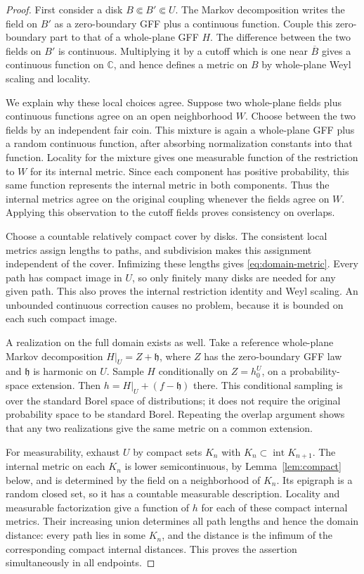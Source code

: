 \documentclass[11pt]{article}
\theoremstyle{definition}
\theoremstyle{remark}
\newcommand{\C}{\mathbb C}
\begin{document}
\begin{proof}
First consider a disk $B\Subset B'\Subset U$. The Markov
decomposition writes the field on $B'$ as a zero-boundary GFF plus
a continuous function. Couple this zero-boundary part to that of a
whole-plane GFF $H$. The difference between the two fields on $B'$
is continuous. Multiplying it by a cutoff which is one near
$\overline B$ gives a continuous function on $\C$, and hence
defines a metric on $B$ by whole-plane Weyl scaling and locality.

We explain why these local choices agree. Suppose two whole-plane
fields plus continuous functions agree on an open neighborhood $W$.
Choose between the two fields by an independent fair coin. This
mixture is again a whole-plane GFF plus a random continuous function,
after absorbing normalization constants into that function. Locality
for the mixture gives one measurable function of the restriction to
$W$ for its internal metric. Since each component has positive
probability, this same function represents the internal metric in
both components. Thus the internal metrics agree on the original
coupling whenever the fields agree on $W$. Applying this observation
to the cutoff fields proves consistency on overlaps.

Choose a countable relatively compact cover by disks. The consistent
local metrics assign lengths to paths, and subdivision makes this
assignment independent of the cover. Infimizing these lengths gives
\eqref{eq:domain-metric}. Every path has compact image in $U$, so
only finitely many disks are needed for any given path. This also
proves the internal restriction identity and Weyl scaling. An
unbounded continuous correction causes no problem, because it is
bounded on each such compact image.

A realization on the full domain exists as well. Take a reference
whole-plane Markov decomposition
$H|_U=Z+\mathfrak h$, where $Z$ has the zero-boundary GFF law and
$\mathfrak h$ is harmonic on $U$. Sample $H$ conditionally on
$Z=h_0^U$, on a probability-space extension. Then
$h=H|_U+(f-\mathfrak h)$ there. This conditional sampling is over
the standard Borel space of distributions; it does not require the
original probability space to be standard Borel. Repeating the
overlap argument shows that any two realizations give the same
metric on a common extension.

For measurability, exhaust $U$ by compact sets $K_n$ with
$K_n\subset\operatorname{int}K_{n+1}$. The internal metric on each
$K_n$ is lower semicontinuous, by Lemma~\ref{lem:compact} below,
and is determined by the field on a neighborhood of $K_n$.
Its epigraph is a random closed set, so it has a countable measurable
description. Locality and measurable factorization give a function
of $h$ for each of these compact internal metrics. Their increasing
union determines all path lengths and hence the domain distance:
every path lies in some $K_n$, and the distance is the infimum of
the corresponding compact internal distances. This proves the
assertion simultaneously in all endpoints.


\end{proof}
\end{document}
